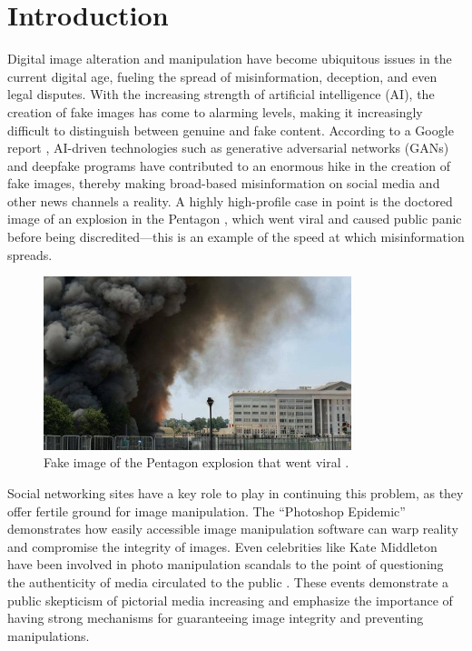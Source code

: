 \chapter{Introduction}

Digital image alteration and manipulation have become ubiquitous issues in the current digital age,
fueling the spread of misinformation, deception, and even legal disputes. With the increasing
strength of artificial intelligence (AI), the creation of fake images has come to alarming levels,
making it increasingly difficult to distinguish between genuine and fake content. According
to a Google report \cite{yang2024}, AI-driven technologies such as generative adversarial
networks (GANs) and deepfake programs have contributed to an enormous hike in the creation of
fake images, thereby making broad-based misinformation on social media and other news channels
a reality. A highly high-profile case in point is the doctored image of an explosion in the Pentagon
\cite{pentagonExplosion}, which went viral and caused public panic before being discredited---this
is an example of the speed at which misinformation spreads.

\begin{figure}[htpb]
    \centering
    \includegraphics[width=0.8\textwidth]{images/fakePentagonImage.png}
    \caption{Fake image of the Pentagon explosion that went viral \cite{thetimesStockMarketImage}.}
    \label{fig:fakePentagonImage}
\end{figure}

Social networking sites have a key role to play in continuing this problem, as they offer fertile
ground for image manipulation. The ``Photoshop Epidemic'' \cite{photoshopEpidemic} demonstrates
how easily accessible image manipulation software can warp reality and compromise the integrity
of images. Even celebrities like Kate Middleton have been involved in photo manipulation scandals
to the point of questioning the authenticity of media circulated to the public \cite{kateMiddletonControversy}.
These events demonstrate a public skepticism of pictorial media increasing and emphasize the
importance of having strong mechanisms for guaranteeing image integrity and preventing manipulations.

